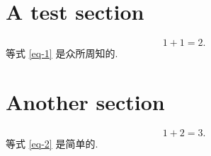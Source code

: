 \documentclass{ctexart}
\begin{document}
\section{A test section}
\begin{equation}\label{eq-1}
1+1=2.
\end{equation}
等式 \ref{eq-1} 是众所周知的. %
\section{Another section} 
\begin{equation}\label{eq-2} 1+2=3.
\end{equation}
等式 \ref{eq-2} 是简单的. 
\end{document}
